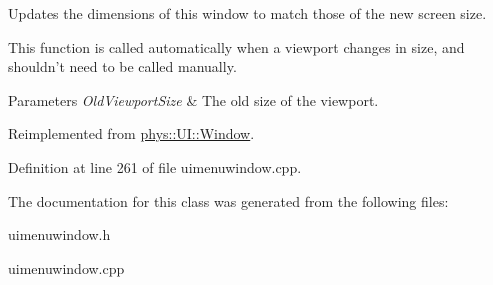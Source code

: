 Updates the dimensions of this window to match those of the new screen size. 

This function is called automatically when a viewport changes in size, and shouldn't need to be called manually. 
\begin{DoxyParams}{Parameters}
{\em OldViewportSize} & The old size of the viewport. \\
\hline
\end{DoxyParams}


Reimplemented from \hyperlink{classphys_1_1UI_1_1Window_a0be6c93e5660757a5f94227f2e076ba9}{phys::UI::Window}.



Definition at line 261 of file uimenuwindow.cpp.



The documentation for this class was generated from the following files:\begin{DoxyCompactItemize}
\item 
uimenuwindow.h\item 
uimenuwindow.cpp\end{DoxyCompactItemize}
